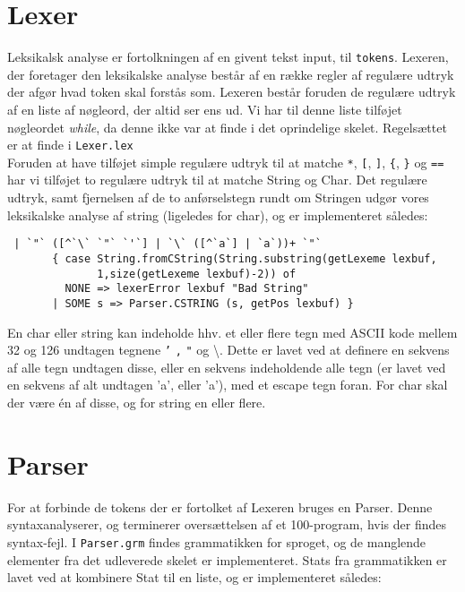 \documentclass[12pt]{article}
\begin{document}
\section{Lexer}
Leksikalsk analyse er fortolkningen af en givent tekst input, til \texttt{tokens}. Lexeren, der foretager den leksikalske analyse består af en række regler af regulære udtryk der afgør hvad token skal forstås som. Lexeren består foruden de regulære udtryk af en liste af nøgleord, der altid ser ens ud. Vi har til denne liste tilføjet nøgleordet \textit{while}, da denne ikke var at finde i det oprindelige skelet. Regelsættet er at finde i \texttt{Lexer.lex}\\
Foruden at have tilføjet simple regulære udtryk til at matche \texttt{*}, \texttt{[}, \texttt{]}, \texttt{\{}, \texttt{\}} og \texttt{==} har vi tilføjet to regulære udtryk til at matche String og Char. Det regulære udtryk, samt fjernelsen af de to anførselstegn rundt om Stringen udgør vores leksikalske analyse af string (ligeledes for char), og er implementeret således:\\

\begin{verbatim}
 | `"` ([^`\` `"` `'`] | `\` ([^`a`] | `a`))+ `"`
       { case String.fromCString(String.substring(getLexeme lexbuf,
              1,size(getLexeme lexbuf)-2)) of
         NONE => lexerError lexbuf "Bad String"
       | SOME s => Parser.CSTRING (s, getPos lexbuf) }
\end{verbatim}	 
    
En char eller string kan indeholde hhv. et eller flere tegn med ASCII kode mellem 32 og 126 undtagen tegnene \texttt{’} \texttt{,} \texttt{"} og \textbackslash. Dette er lavet ved at definere en sekvens af alle tegn undtagen disse, eller en sekvens indeholdende alle tegn (er lavet ved en sekvens af alt undtagen 'a', eller 'a'), med et escape tegn foran. For char skal der være én af disse, og for string en eller flere.
    
    
\section{Parser}
For at forbinde de tokens der er fortolket af Lexeren bruges en Parser. Denne syntaxanalyserer, og terminerer oversættelsen af et 100-program, hvis der findes syntax-fejl. I \texttt{Parser.grm} findes grammatikken for sproget, og de manglende elementer fra det udleverede skelet er implementeret. Stats fra grammatikken er lavet ved at kombinere Stat til en liste, og er implementeret således:\\
\end{document}
